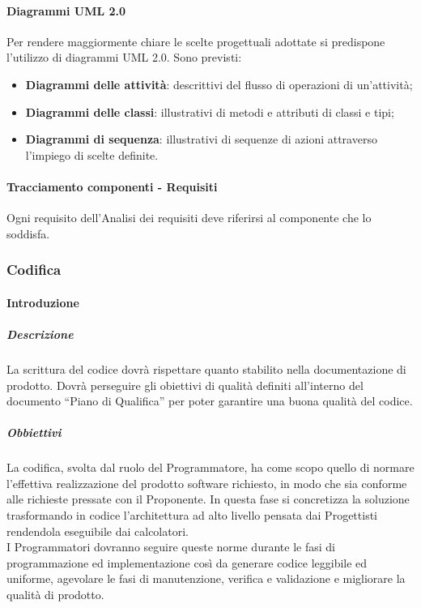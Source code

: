 			\paragraph{Diagrammi UML 2.0}
				Per rendere maggiormente chiare le scelte progettuali adottate si predispone l’utilizzo di diagrammi UML 2.0. Sono previsti:\\
				\begin{itemize}
					\item\textbf{Diagrammi delle attività}: descrittivi del flusso di operazioni di un’attività;
					\item\textbf{Diagrammi delle classi}: illustrativi di metodi e attributi di classi e tipi;
					\item\textbf{Diagrammi di sequenza}: illustrativi di sequenze di azioni attraverso l’impiego di scelte definite.
				\end{itemize}
			\paragraph{Tracciamento componenti - Requisiti}
				Ogni requisito dell’Analisi dei requisiti deve riferirsi al componente che lo soddisfa.\\
		\subsubsection{Codifica}
			\paragraph{Introduzione}
				\subparagraph{Descrizione}
					La scrittura del codice dovrà rispettare quanto stabilito nella documentazione di prodotto. Dovrà perseguire gli obiettivi di qualità definiti all'interno del documento “Piano di Qualifica” per poter garantire una buona qualità del codice.\\
				\subparagraph{Obbiettivi}
					La codifica, svolta dal ruolo del Programmatore, ha come scopo quello di normare l’effettiva realizzazione del prodotto software richiesto, in modo che sia conforme alle richieste pressate con il Proponente. In questa fase si concretizza la soluzione trasformando in codice l’architettura ad alto livello pensata dai Progettisti rendendola eseguibile dai calcolatori.\\
					I Programmatori dovranno seguire queste norme durante le fasi di programmazione ed implementazione così da generare codice leggibile ed uniforme, agevolare le fasi di manutenzione, verifica e validazione e migliorare la qualità di prodotto.\\
